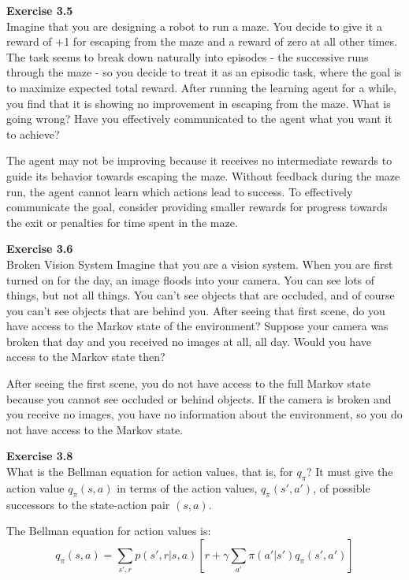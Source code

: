 \documentclass[addpoints]{exam}
\begin{document}
\begin{questions}
    \question
    \textbf{Exercise 3.5} \\ Imagine that you are designing a robot to run a maze. You decide to give it a reward of +1 for escaping from the maze and a reward of zero at all other times. The task seems to break down naturally into episodes - the successive runs through the maze - so you decide to treat it as an episodic task, where the goal is to maximize expected total reward. After running the learning agent for a while, you find that it is showing no improvement in escaping from the maze. What is going wrong? Have you effectively communicated to the agent what you want it to achieve?
    \begin{solution}
        The agent may not be improving because it receives no intermediate rewards to guide its behavior towards escaping the maze. Without feedback during the maze run, the agent cannot learn which actions lead to success. To effectively communicate the goal, consider providing smaller rewards for progress towards the exit or penalties for time spent in the maze.
    \end{solution}

    \question
    \textbf{Exercise 3.6} \\ Broken Vision System Imagine that you are a vision system. When you are first turned on for the day, an image floods into your camera. You can see lots of things, but not all things. You can’t see objects that are occluded, and of course you can’t see objects that are behind you. After seeing that first scene, do you have access to the Markov state of the environment? Suppose your camera was broken that day and you received no images at all, all day. Would you have access to the Markov state then?
    \begin{solution}
        After seeing the first scene, you do not have access to the full Markov state because you cannot see occluded or behind objects. If the camera is broken and you receive no images, you have no information about the environment, so you do not have access to the Markov state.
    \end{solution}

    \question
    \textbf{Exercise 3.8} \\ What is the Bellman equation for action values, that is, for \( q_{\pi} \)? It must give the action value \( q_{\pi}(s, a) \) in terms of the action values, \( q_{\pi}(s', a') \), of possible successors to the state-action pair \( (s, a) \).
    \begin{solution}
        The Bellman equation for action values is:
        \[
        q_{\pi}(s, a) = \sum_{s', r} p(s', r | s, a) \left[ r + \gamma \sum_{a'} \pi(a' | s') q_{\pi}(s', a') \right]
        \]
    \end{solution}


\end{questions}
\end{document}
